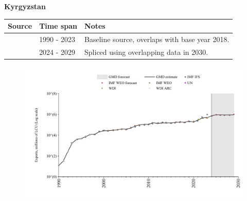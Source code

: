 \documentclass[12pt,a4paper,landscape]{article}
\begin{document}
\begin{adjustbox}{max totalsize={\paperwidth}{\paperheight},center}
\begin{minipage}[t][\textheight][t]{\textwidth}
\vspace*{0.5cm}
{}
\begin{center}
{\Large\bfseries Kyrgyzstan}
\end{center}
\vspace{0.5cm}
\begin{table}[H]
\centering
\small
\begin{tabular}{|l|l|l|}
\hline
\textbf{Source} & \textbf{Time span} & \textbf{Notes} \\
\hline
\rowcolor{white}\cite{WDI}& 1990 - 2023 &Baseline source, overlaps with base year 2018.\\
\rowcolor{lightgray}\cite{IMF_WEO_forecast}& 2024 - 2029 &Spliced using overlapping data in 2030.\\
\hline
\end{tabular}
\end{table}
\begin{figure}[H]
\centering
\includegraphics[width=\textwidth,height=0.6\textheight,keepaspectratio]{graphs/KGZ_exports.pdf}
\end{figure}
\end{minipage}
\end{adjustbox}
\end{document}
